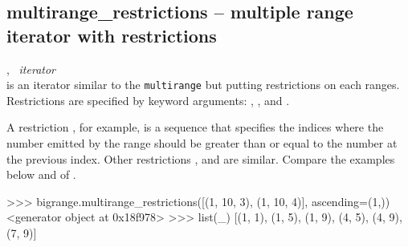   \subsection{multirange\_restrictions -- multiple range iterator with restrictions}
   {%
     ,\ %
   }{%
     {\em iterator}
   }\\
   \spacing
    is an iterator similar to the
   {\tt multirange} but putting restrictions on each ranges.\\
   \spacing
   \quad Restrictions are specified by keyword arguments: ,
   ,  and
   .

   A restriction , for example, is a sequence that
   specifies the indices where the number emitted by the range should
   be greater than or equal to the number at the previous index.
   Other restrictions , 
   and  are similar.  Compare the examples
   below and of .

%
\begin{ex}
>>> bigrange.multirange_restrictions([(1, 10, 3), (1, 10, 4)], ascending=(1,))
<generator object at 0x18f978>
>>> list(_)
[(1, 1), (1, 5), (1, 9), (4, 5), (4, 9), (7, 9)]
\end{ex}%
\C


